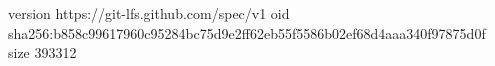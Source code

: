 version https://git-lfs.github.com/spec/v1
oid sha256:b858c99617960c95284bc75d9e2ff62eb55f5586b02ef68d4aaa340f97875d0f
size 393312
